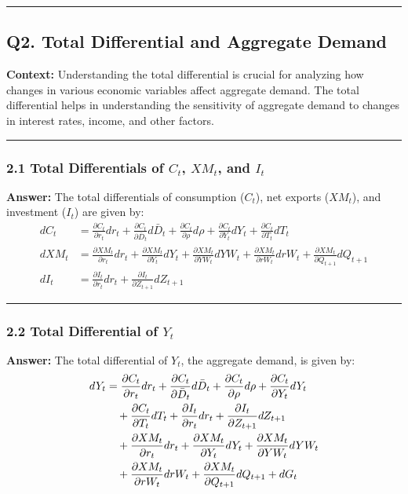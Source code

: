 \documentclass{article}
\begin{document}
\noindent\rule{\linewidth}{1pt}

\subsection*{Q2. Total Differential and Aggregate Demand}

\textbf{Context:} Understanding the total differential is crucial for analyzing how changes in various economic variables affect aggregate demand. The total differential helps in understanding the sensitivity of aggregate demand to changes in interest rates, income, and other factors.

\noindent\rule{\linewidth}{0.5pt}

\subsubsection*{2.1 Total Differentials of \( C_t \), \( XM_t \), and \( I_t \)}

\textbf{Answer:}
The total differentials of consumption (\( C_t \)), net exports (\( XM_t \)), and investment (\( I_t \)) are given by:
\begin{align}
    dC_t &= \frac{\partial C_t}{\partial r_t} dr_t + \frac{\partial C_t}{\partial \bar{D}_t} d\bar{D}_t + \frac{\partial C_t}{\partial \rho} d\rho + \frac{\partial C_t}{\partial Y_t} dY_t + \frac{\partial C_t}{\partial T_t} dT_t \tag{2.12} \\
    dXM_t &= \frac{\partial XM_t}{\partial r_t} dr_t + \frac{\partial XM_t}{\partial Y_t} dY_t + \frac{\partial XM_t}{\partial YW_t} dYW_t + \frac{\partial XM_t}{\partial rW_t} drW_t + \frac{\partial XM_t}{\partial Q_{t+1}} dQ_{t+1} \tag{2.19} \\
    dI_t &= \frac{\partial I_t}{\partial r_t} dr_t + \frac{\partial I_t}{\partial Z_{t+1}} dZ_{t+1} \tag{2.16}
\end{align}

\noindent\rule{\linewidth}{0.5pt}

\subsubsection*{2.2 Total Differential of \( Y_t \)}

\textbf{Answer:}
The total differential of \( Y_t \), the aggregate demand, is given by:
\begin{align*}
    dY_t &= \frac{\partial C_t}{\partial r_t} dr_t + \frac{\partial C_t}{\partial \bar{D}_t} d\bar{D}_t + \frac{\partial C_t}{\partial \rho} d\rho + \frac{\partial C_t}{\partial Y_t} dY_t \notag \\
    &\quad + \frac{\partial C_t}{\partial T_t} dT_t + \frac{\partial I_t}{\partial r_t} dr_t + \frac{\partial I_t}{\partial Z_{t+1}} dZ_{t+1} \notag \\
    &\quad + \frac{\partial XM_t}{\partial r_t} dr_t + \frac{\partial XM_t}{\partial Y_t} dY_t + \frac{\partial XM_t}{\partial YW_t} dYW_t \notag \\
    &\quad + \frac{\partial XM_t}{\partial rW_t} drW_t + \frac{\partial XM_t}{\partial Q_{t+1}} dQ_{t+1} + dG_t
\end{align*}
\end{document}
